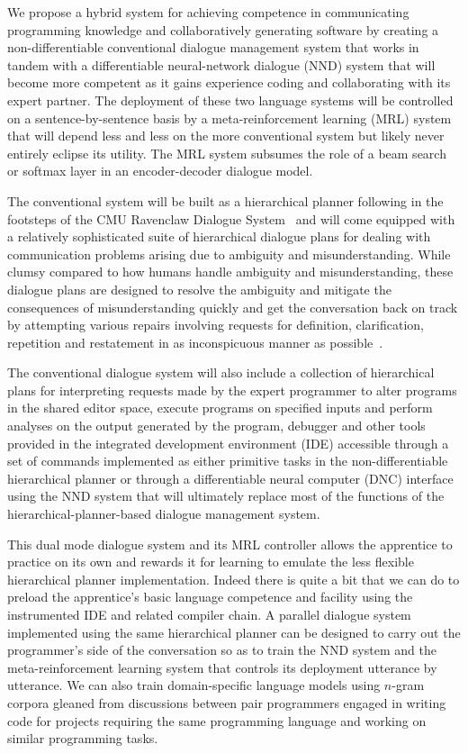 We propose a hybrid system for achieving competence in communicating programming knowledge and collaboratively generating software by creating a non-differentiable conventional dialogue management system that works in tandem with a differentiable neural-network dialogue (NND) system that will become more competent as it gains experience coding and collaborating with its expert partner. The deployment of these two language systems will be controlled on a sentence-by-sentence basis by a meta-reinforcement learning (MRL) system that will depend less and less on the more conventional system but likely never entirely eclipse its utility. The MRL system subsumes the role of a beam search or softmax layer in an encoder-decoder dialogue model. 


The conventional system will be built as a hierarchical planner following in the footsteps of the CMU Ravenclaw Dialogue System~\cite{BohusandRudnickyCSL-09} and will come equipped with a relatively sophisticated suite of hierarchical dialogue plans for dealing with communication problems arising due to ambiguity and misunderstanding. While clumsy compared to how humans handle ambiguity and misunderstanding, these dialogue plans are designed to resolve the ambiguity and mitigate the consequences of misunderstanding quickly and get the conversation back on track by attempting various repairs involving requests for definition, clarification, repetition and restatement in as inconspicuous manner as possible~\cite{BohusPhD-07}.

The conventional dialogue system will also include a collection of hierarchical plans for interpreting requests made by the expert programmer to alter programs in the shared editor space, execute programs on specified inputs and perform analyses on the output generated by the program, debugger and other tools provided in the integrated development environment (IDE) accessible through a set of commands implemented as either primitive tasks in the non-differentiable hierarchical planner or through a differentiable neural computer (DNC) interface using the NND system that will ultimately replace most of the functions of the hierarchical-planner-based dialogue management system.

This dual mode dialogue system and its MRL controller allows the apprentice to practice on its own and rewards it for learning to emulate the less flexible hierarchical planner implementation. Indeed there is quite a bit that we can do to preload the apprentice’s basic language competence and facility using the instrumented IDE and related compiler chain. A parallel dialogue system implemented using the same hierarchical planner can be designed to carry out the programmer’s side of the conversation so as to train the NND system and the meta-reinforcement learning system that controls its deployment utterance by utterance. We can also train domain-specific language models using $n$-gram corpora gleaned from discussions between pair programmers engaged in writing code for projects requiring the same programming language and working on similar programming tasks.


